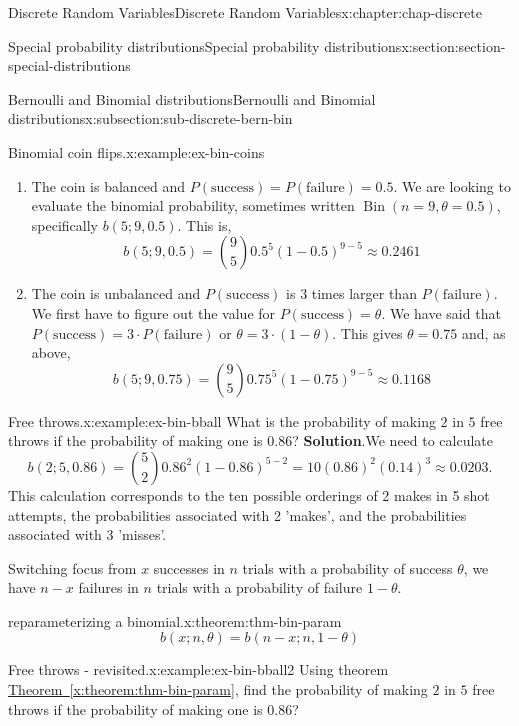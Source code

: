 \documentclass[oneside,10pt,]{book}
\newcommand{\blocktitlefont}{\relax}
\newcommand{\xreffont}{\relax}
\begin{document}
\begin{chapterptx}{Discrete Random Variables}{}{Discrete Random Variables}{}{}{x:chapter:chap-discrete}
\begin{sectionptx}{Special probability distributions}{}{Special probability distributions}{}{}{x:section:section-special-distributions}
\begin{subsectionptx}{Bernoulli and Binomial distributions}{}{Bernoulli and Binomial distributions}{}{}{x:subsection:sub-discrete-bern-bin}
\begin{example}{Binomial coin flips.}{x:example:ex-bin-coins}
\begin{enumerate}
\item{}The coin is balanced and \(P(\text{success}) = P(\text{failure})
= 0.5\). We are looking to evaluate the binomial probability, sometimes written \(\operatorname{Bin}(n=9, \theta=0.5)\), specifically \(b(5; 9,
0.5)\). This is,%
\begin{equation*}
b(5; 9, 0.5) = {9 \choose 5}0.5^5(1-0.5)^{9-5} \approx
0.2461 
\end{equation*}
%
\item{}The coin is unbalanced and \(P(\text{success})\) is \(3\) times larger than \(P(\text{failure})\). We first have to figure out the value for \(P(\text{success}) =
\theta\). We have said that \(P(\text{success}) = 3\cdot P(\text{failure})\) or \(\theta = 3\cdot (1-\theta)\). This gives \(\theta = 0.75\) and, as above,%
\begin{equation*}
b(5; 9, 0.75) = {9
\choose 5}0.75^5(1-0.75)^{9-5} \approx 0.1168 
\end{equation*}
%
\end{enumerate}
\end{example}
\begin{example}{Free throws.}{x:example:ex-bin-bball}%
What is the probability of making \(2\) in \(5\) free throws if the probability of making one is \(0.86\)?%
\textbf{\blocktitlefont Solution}.\quad{}We need to calculate%
\begin{equation*}
b(2; 5, 0.86) = {5\choose2}0.86^2(1-0.86)^{5-2}
= 10(0.86)^2(0.14)^3 \approx 0.0203\text{.}
\end{equation*}
This calculation corresponds to the ten possible orderings of 2 makes in 5 shot attempts, the probabilities associated with 2 'makes', and the probabilities associated with 3 'misses'.%
\end{example}
Switching focus from \(x\) successes in \(n\) trials with a probability of success \(\theta\), we have \(n-x\) failures in \(n\) trials with a probability of failure \(1-\theta\).%
\begin{theorem}{reparameterizing a binomial.}{}{x:theorem:thm-bin-param}%
%
\begin{equation*}
b(x; n, \theta) = b(n-x; n, 1-\theta)
\end{equation*}
%
\end{theorem}
\begin{example}{Free throws - revisited.}{x:example:ex-bin-bball2}%
Using theorem \hyperref[x:theorem:thm-bin-param]{Theorem~{\xreffont\ref{x:theorem:thm-bin-param}}}, find the probability of making \(2\) in \(5\) free throws if the probability of making one is \(0.86\)?%

\end{example}
\end{subsectionptx}
\end{sectionptx}
\end{chapterptx}
\end{document}
